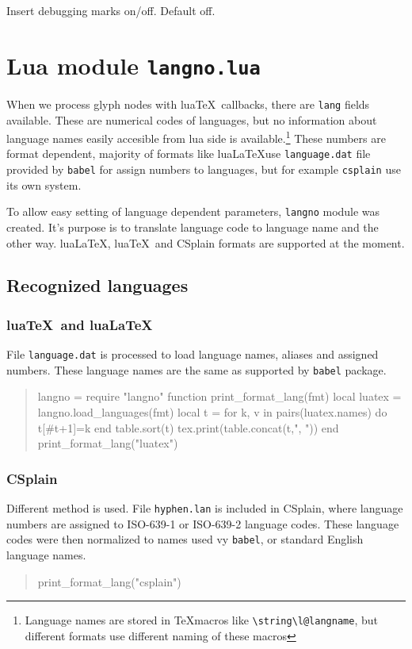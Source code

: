 \documentclass[12pt]{ltxdoc}
\begin{document}
Insert debugging marks on/off. Default off.

\section{Lua module \texttt{langno.lua}}

When we process glyph nodes with lua\TeX\ callbacks, there are \verb|lang| 
fields available. These are numerical codes of languages, but no information
about language names easily accesible from lua side is available.\footnote{%
	Language names are stored in \TeX macros like \verb|\string\l@langname|, but 
	different formats use different naming of these macros}
These numbers are format dependent, majority of formats like 
lua\LaTeX use \verb|language.dat| file provided by \verb|babel| 
for assign numbers to languages, but for example \verb|csplain| 
use its own system.

To allow easy setting of language dependent parameters, \verb|langno| module 
was created. It's purpose is to translate language code to language name and 
the other way. lua\LaTeX, lua\TeX\ and CSplain formats are supported at the moment.

\subsection{Recognized languages}
\subsubsection{lua\TeX\ and lua\LaTeX}

File \verb|language.dat| is processed to load language names, aliases and assigned numbers. These language names are the same as supported by \verb|babel| package.

\begin{quotation}
  \small\noindent
\begin{luacode*}
  langno = require "langno"
  function print_format_lang(fmt)
    local luatex = langno.load_languages(fmt)
    local t = {}
    for k, v in pairs(luatex.names) do
      t[#t+1]=k
    end
    table.sort(t)
    tex.print(table.concat(t,", "))
  end
  print_format_lang("luatex")
\end{luacode*}
\end{quotation}

\subsubsection{CSplain}

Different method is used. File \verb|hyphen.lan| is included in CSplain, where 
language numbers are assigned to ISO-639-1 or ISO-639-2 language codes. 
These language codes were then normalized to names used vy \verb|babel|, or 
standard English language names.

\begin{quotation}
  \small\noindent
  \begin{luacode*}
    print_format_lang("csplain")
  \end{luacode*}
\end{quotation}
\end{document}
